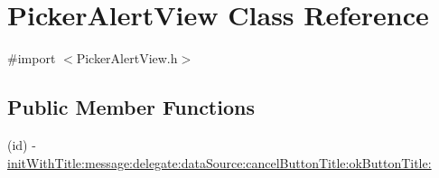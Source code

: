 \hypertarget{interface_picker_alert_view}{
\section{PickerAlertView Class Reference}
\label{interface_picker_alert_view}
}


{\ttfamily \#import $<$PickerAlertView.h$>$}

\subsection*{Public Member Functions}
\begin{DoxyCompactItemize}
\item 
(id) -\/ \hyperlink{interface_picker_alert_view_aeab9bea3a278c79473d39f3629cb2086}{initWithTitle:message:delegate:dataSource:cancelButtonTitle:okButtonTitle:}
\end{DoxyCompactItemize}
